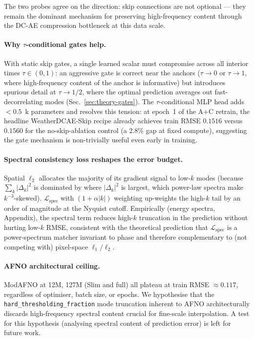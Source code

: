 \documentclass[10pt,letterpaper,twocolumn]{article}
\begin{document}
The two probes agree on the direction: skip connections are not
optional --- they remain the dominant mechanism for preserving
high-frequency content through the DC-AE compression bottleneck at
this data scale.

\paragraph{Why $\tau$-conditional gates help.}
With static skip gates, a single learned scalar must compromise across all
interior times $\tau \in (0,1)$: an aggressive gate is correct near the
anchors ($\tau \to 0$ or $\tau \to 1$, where high-frequency content of the
anchor is informative) but introduces spurious detail at $\tau \to 1/2$,
where the optimal prediction averages out fast-decorrelating modes
(Sec.~\ref{sec:theory-gates}). The $\tau$-conditional MLP head adds $<0.5$~k
parameters and resolves this tension: at epoch~1 of the A+C retrain, the
headline WeatherDCAE-Skip recipe already achieves train RMSE $0.1516$ versus
$0.1560$ for the no-skip-ablation control (a 2.8\% gap at fixed compute),
suggesting the gate mechanism is non-trivially useful even early in
training.

\paragraph{Spectral consistency loss reshapes the error budget.}
Spatial $\ell_2$ allocates the majority of its gradient signal to low-$k$
modes (because $\sum_k |\Delta_k|^2$ is dominated by where $|\Delta_k|^2$ is
largest, which power-law spectra make $k^{-3}$-skewed). $\mathcal{L}_\text{spec}$
with $(1+\alpha|k|)$ weighting up-weights the high-$k$ tail by an order of
magnitude at the Nyquist cutoff. Empirically (energy spectra, Appendix),
the spectral term reduces high-$k$ truncation in the prediction without
hurting low-$k$ RMSE, consistent with the theoretical prediction that
$\mathcal{L}_\text{spec}$ is a power-spectrum matcher invariant to phase
and therefore complementary to (not competing with) pixel-space
$\ell_1/\ell_2$.

\paragraph{AFNO architectural ceiling.}
ModAFNO at 12M, 127M (Slim and full) all plateau at train RMSE
$\approx 0.117$, regardless of optimiser, batch size, or epochs. We
hypothesise that the \texttt{hard\_thresholding\_fraction} mode truncation
inherent to AFNO architecturally discards high-frequency spectral content
crucial for fine-scale interpolation. A test for this hypothesis (analysing
spectral content of prediction error) is left for future work.
\end{document}
